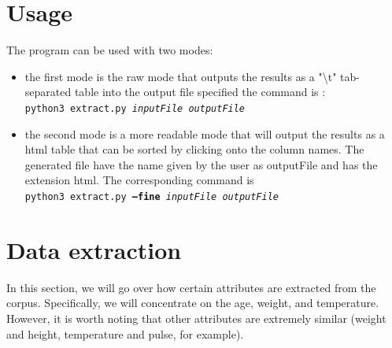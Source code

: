 \documentclass[10pt, a4paper, oneside]{article} %
\begin{document}
\section{Usage}
The program can be used with two modes: 
\begin{itemize}
\item the first mode is the raw mode that outputs the results as a "\textbackslash t" tab-separated table into the output file specified the command is : \\
\texttt{python3 extract.py \textit{inputFile} \textit{outputFile}}
\item the second mode is a more readable mode that will output the results as a html table that can be sorted by clicking onto the column names. The generated file have the name given by the user as outputFile and has the extension html. The corresponding command is \\
\texttt{python3 extract.py \textbf{--fine} \textit{inputFile} \textit{outputFile}}
\end{itemize}

\section{Data extraction}
In this section, we will go over how certain attributes are extracted from the corpus. Specifically, we will concentrate on the age, weight, and temperature. However, it is worth noting that other attributes are extremely similar (weight and height, temperature and pulse, for example).
\end{document}
